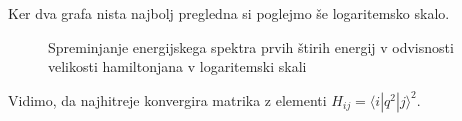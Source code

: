Ker dva grafa nista najbolj pregledna si poglejmo še logaritemsko skalo.
\begin{figure}[h]
    \begin{center}
    \end{center}
    \caption{Spreminjanje energijskega spektra prvih štirih energij v odvisnosti velikosti hamiltonjana v logaritemski skali}
\end{figure}
Vidimo, da najhitreje konvergira matrika z elementi $H_{ij} = \langle i | q^2 | j \rangle^2 $.